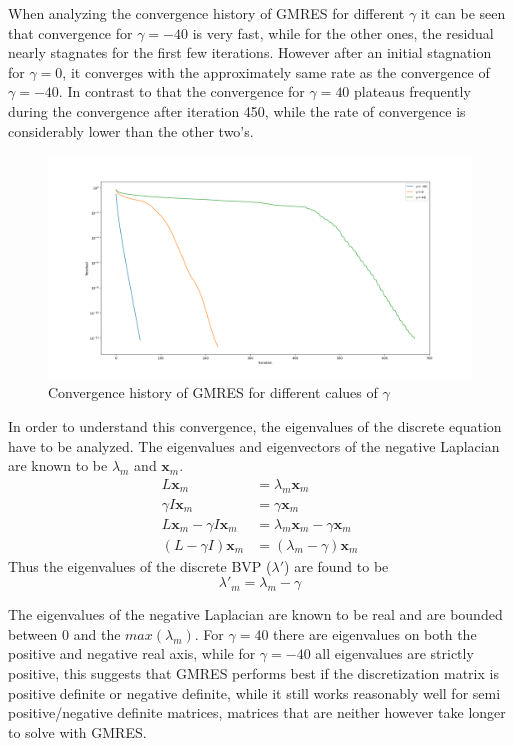 \documentclass{article}
\begin{document}
When analyzing the convergence history of GMRES for different $\gamma$ it can be seen that convergence for $\gamma=-40$ is very fast, while for the other ones, the residual nearly stagnates for the first few iterations. However after an initial stagnation for $\gamma=0$, it converges with the approximately same rate as the convergence of $\gamma=-40$. In contrast to that the convergence for $\gamma=40$ plateaus frequently during the convergence after iteration 450, while the rate of convergence is considerably lower than the other two's.
\begin{figure}[H]
	\centering
	\includegraphics[width=.9\linewidth]{5convergence.png}
	\caption{Convergence history of GMRES for different calues of $\gamma$}
\end{figure}

In order to understand this convergence, the eigenvalues of the discrete equation have to be analyzed. The eigenvalues and eigenvectors of the negative Laplacian are known to be $\lambda_m$ and $\mathbf{x}_m$.
\begin{align}
	L\mathbf{x}_m &= \lambda_m\mathbf{x}_m\\
	\gamma I \mathbf{x}_m &= \gamma \mathbf{x}_m \\
	L\mathbf{x}_m - \gamma I \mathbf{x}_m &= \lambda_m\mathbf{x}_m - \gamma \mathbf{x}_m\\
	\left(L- \gamma I\right) \mathbf{x}_m &= \left(\lambda_m - \gamma\right) \mathbf{x}_m
\end{align}
Thus the eigenvalues of the discrete BVP ($\lambda'$)  are found to be
\begin{equation}
	\lambda'_m = \lambda_m-\gamma
\end{equation}

The eigenvalues of the negative Laplacian are known to be real and are bounded between 0 and the $max(\lambda_m)$.  For $\gamma=40$ there are eigenvalues on both the positive and negative real axis, while for $\gamma=-40$ all eigenvalues are strictly positive, this suggests that GMRES performs best if the discretization matrix is positive definite or negative definite, while it still works reasonably well for semi positive/negative definite matrices, matrices that are neither however take longer to solve with GMRES.
    
\end{document}
